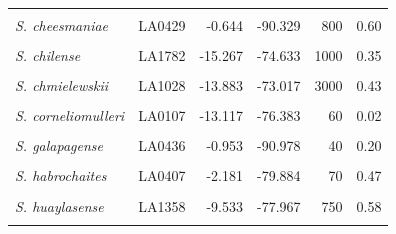\documentclass[
  letterpaper,
  DIV=11,
  numbers=noendperiod]{scrartcl}
\begin{document}
\begin{longtable}{>{\raggedright\arraybackslash}p{3.25cm}lrrrr}
\endfoot
\bottomrule
\endlastfoot
\em{\cellcolor{gray!10}{S. arcanum}} & \cellcolor{gray!10}{LA2172} & \cellcolor{gray!10}{-6.008} & \cellcolor{gray!10}{-78.858} & \cellcolor{gray!10}{662} & \cellcolor{gray!10}{0.70}\\
\em{S. cheesmaniae} & LA0429 & -0.644 & -90.329 & 800 & 0.60\\
\em{\cellcolor{gray!10}{S. cheesmaniae}} & \cellcolor{gray!10}{LA3124} & \cellcolor{gray!10}{-0.804} & \cellcolor{gray!10}{-90.042} & \cellcolor{gray!10}{1} & \cellcolor{gray!10}{0.36}\\
\em{S. chilense} & LA1782 & -15.267 & -74.633 & 1000 & 0.35\\
\em{\cellcolor{gray!10}{S. chilense}} & \cellcolor{gray!10}{LA4117A} & \cellcolor{gray!10}{-22.907} & \cellcolor{gray!10}{-67.941} & \cellcolor{gray!10}{3540} & \cellcolor{gray!10}{0.22}\\
\addlinespace
\em{S. chmielewskii} & LA1028 & -13.883 & -73.017 & 3000 & 0.43\\
\em{\cellcolor{gray!10}{S. chmielewskii}} & \cellcolor{gray!10}{LA1316} & \cellcolor{gray!10}{-13.400} & \cellcolor{gray!10}{-73.906} & \cellcolor{gray!10}{2920} & \cellcolor{gray!10}{1.07}\\
\em{S. corneliomulleri} & LA0107 & -13.117 & -76.383 & 60 & 0.02\\
\em{\cellcolor{gray!10}{S. corneliomulleri}} & \cellcolor{gray!10}{LA0444} & \cellcolor{gray!10}{-13.433} & \cellcolor{gray!10}{-76.133} & \cellcolor{gray!10}{100} & \cellcolor{gray!10}{0.49}\\
\em{S. galapagense} & LA0436 & -0.953 & -90.978 & 40 & 0.20\\
\addlinespace
\em{\cellcolor{gray!10}{S. galapagense}} & \cellcolor{gray!10}{LA1044} & \cellcolor{gray!10}{-0.284} & \cellcolor{gray!10}{-90.548} & \cellcolor{gray!10}{0} & \cellcolor{gray!10}{0.18}\\
\em{S. habrochaites} & LA0407 & -2.181 & -79.884 & 70 & 0.47\\
\em{\cellcolor{gray!10}{S. habrochaites}} & \cellcolor{gray!10}{LA1777} & \cellcolor{gray!10}{-9.550} & \cellcolor{gray!10}{-77.700} & \cellcolor{gray!10}{3216} & \cellcolor{gray!10}{0.42}\\
\em{S. huaylasense} & LA1358 & -9.533 & -77.967 & 750 & 0.58\\
\em{\cellcolor{gray!10}{S. huaylasense}} & \cellcolor{gray!10}{LA1360} & \cellcolor{gray!10}{-9.546} & \cellcolor{gray!10}{-77.929} & \cellcolor{gray!10}{1490} & \cellcolor{gray!10}{0.48}\\

\end{longtable}
\end{document}
